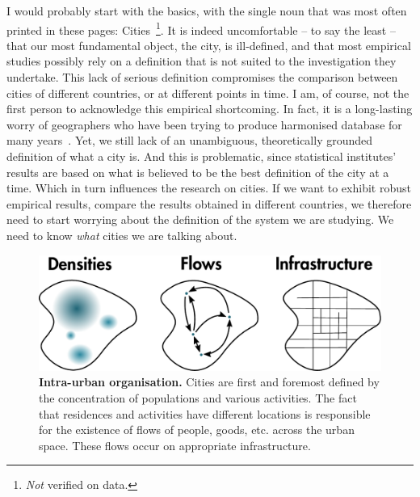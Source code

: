 I would probably start with the basics, with the single noun that was most often
printed in these pages: Cities~\footnote{\emph{Not} verified on data.}. It is
indeed uncomfortable -- to say the least -- that our most fundamental object,
the city, is ill-defined, and that most empirical studies possibly rely on a definition
that is not suited to the investigation they undertake.  This lack of serious
definition compromises the comparison between cities of different countries, or
at different points in time. I am, of course,
not the first person to acknowledge this empirical shortcoming. In fact, it is a
long-lasting worry of geographers who have been trying to produce harmonised
database for many years~\cite{Pumain:2015}. Yet, we still lack of an
unambiguous, theoretically grounded definition of what a city is. And this is
problematic, since statistical institutes' results are based on what is believed
to be the best definition of the city at a time. Which in turn influences the
research on cities. If we want to exhibit robust empirical results, compare the
results obtained in different countries, we therefore need to start worrying
about the definition of the system we are studying. We need to know \emph{what}
cities we are talking about.\\

\begin{figure}
    \centering
    \includegraphics[width=1\textwidth]{gfx/chapter-intro/intra-urban.pdf}
    \caption{{\bf Intra-urban organisation.} Cities are first and foremost defined by
    the concentration of populations and various activities. The fact that
residences and activities have different locations is responsible for the
existence of flows of people, goods, etc. across the urban space. These flows
occur on appropriate infrastructure.\label{fig:intra_urban}}
\end{figure}


